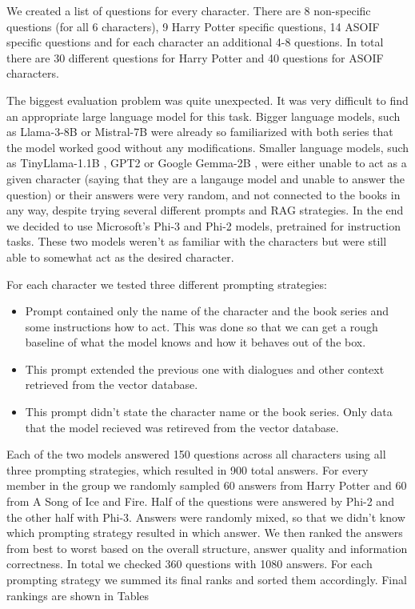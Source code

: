 \documentclass[fleqn,moreauthors,10pt]{ds_report}
\begin{document}
We created a list of questions for every character.
There are 8 non-specific questions (for all 6 characters), 9 Harry Potter specific questions, 14 ASOIF specific questions
and for each character an additional 4-8 questions.
In total there are 30 different questions for Harry Potter and 40 questions for ASOIF characters.

The biggest evaluation problem was quite unexpected. It was very difficult to find an appropriate large language model for this task.
Bigger language models, such as Llama-3-8B \cite{llama3modelcard} or Mistral-7B \cite{jiang2023mistral} were already so familiarized with both series that the model worked good without any modifications.
Smaller language models, such as TinyLlama-1.1B \cite{zhang2024tinyllama}, GPT2 \cite{radford2019language} or Google Gemma-2B \cite{gemma_2024},
were either unable to act as a given character (saying that they are a langauge model and unable to answer the question)
or their answers were very random, and not connected to the books in any way, despite trying several different prompts and RAG strategies.
In the end we decided to use Microsoft's Phi-3 \cite{abdin2024phi} and Phi-2 models, pretrained for instruction tasks.
These two models weren't as familiar with the characters but were still able to somewhat act as the desired character.

For each character we tested three different prompting strategies:
\begin{itemize}
	\item Prompt contained only the name of the character and the book series and some instructions how to act. This was done so that we can get a rough baseline of what the model knows and how it behaves out of the box.
	\item This prompt extended the previous one with dialogues and other context retrieved from the vector database.
	\item This prompt didn't state the character name or the book series. Only data that the model recieved was retireved from the vector database.
\end{itemize}

Each of the two models answered 150 questions across all characters using all three prompting strategies, which resulted in 900 total answers.
For every member in the group we randomly sampled 60 answers from Harry Potter and 60 from A Song of Ice and Fire.
Half of the questions were answered by Phi-2 and the other half with Phi-3.
Answers were randomly mixed, so that we didn't know which prompting strategy resulted in which answer.
We then ranked the answers from best to worst based on the overall structure, answer quality and information correctness.
In total we checked 360 questions with 1080 answers.
For each prompting strategy we summed its final ranks and sorted them accordingly.
Final rankings are shown in Tables 
\end{document}
